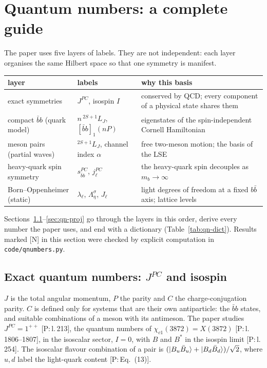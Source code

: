 \documentclass[11pt,a4paper]{article}
\newcommand{\tagP}[1]{\textcolor{blue!65!black}{\textsf{\small[P:\,#1]}}}
\newcommand{\tagN}{\textcolor{red!70!black}{\textsf{\small[N]}}}
\begin{document}
\section{Quantum numbers: a complete guide}
\label{sec:qn}

The paper uses five layers of labels. They are not independent: each layer organises the same Hilbert space so that one symmetry is manifest.
\begin{center}
\small
\begin{tabular}{>{\raggedright\arraybackslash}p{3.6cm}>{\raggedright\arraybackslash}p{4.4cm}>{\raggedright\arraybackslash}p{7.0cm}}
\toprule
layer & labels & why this basis\\
\midrule
exact symmetries & $J^{PC}$, isospin $I$ & conserved by QCD; every component of a physical state shares them\\
compact $\bar bb$ (quark model) & $n\,^{2S+1}L_J$, $[\bar bb]_1(nP)$ & eigenstates of the spin-independent Cornell Hamiltonian\\
meson pairs (partial waves) & $^{2S+1}L_J$, channel index $\alpha$ & free two-meson motion; the basis of the LSE\\
heavy-quark spin symmetry & $s_{\bar bb}^{PC}$, $j_\ell^{PC}$ & the heavy-quark spin decouples as $m_b\to\infty$\\
Born--Oppenheimer (static) & $\lambda_\ell$, $\Lambda_\eta^\sigma$, $J_\ell$ & light degrees of freedom at a fixed $b\bar b$ axis; lattice levels\\
\bottomrule
\end{tabular}
\end{center}
Sections~\ref{sec:qn-exact}--\ref{sec:qn-proj} go through the layers in this order, derive every number the paper uses, and end with a dictionary (Table~\ref{tab:qn-dict}). Results marked \tagN{} in this section were checked by explicit computation in \texttt{code/qnumbers.py}.

\subsection{Exact quantum numbers: $J^{PC}$ and isospin}
\label{sec:qn-exact}

$J$ is the total angular momentum, $P$ the parity and $C$ the charge-conjugation parity. $C$ is defined only for systems that are their own antiparticle: the $\bar bb$ states, and suitable combinations of a meson with its antimeson. The paper studies $J^{PC}=1^{++}$ \tagP{l.\,213}, the quantum numbers of $\chi_{c1}(3872)=X(3872)$ \tagP{l.\,1806--1807}, in the isoscalar sector, $I=0$, with $B$ and $B^*$ in the isospin limit \tagP{l.\,254}. The isoscalar flavour combination of a pair is $(\ket{B_u\bar B_u}+\ket{B_d\bar B_d})/\sqrt2$, where $u,d$ label the light-quark content \tagP{Eq.~(13)}.
\end{document}
